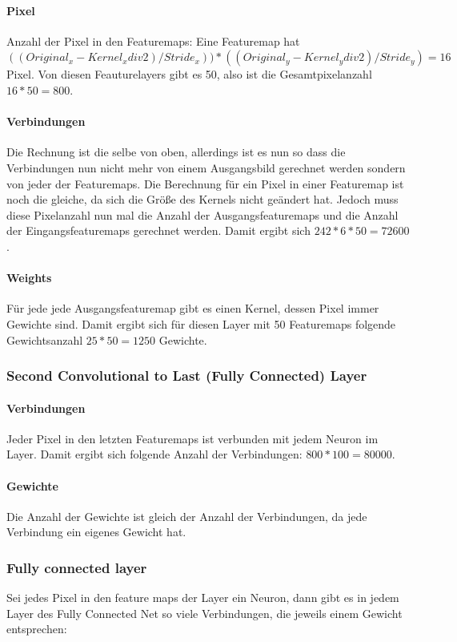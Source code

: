 \documentclass{article}
\begin{document}
\paragraph{Pixel}
Anzahl der Pixel in den Featuremaps: Eine Featuremap hat $((Original_x - Kernel_x div 2) / Stride_x)) * ((Original_y - Kernel_y div 2) / Stride_y) = 16$ Pixel.
Von diesen Feauturelayers gibt es 50, also ist die Gesamtpixelanzahl $16 * 50 = 800$.
\paragraph{Verbindungen}
Die Rechnung ist die selbe von oben, allerdings ist es nun so dass die Verbindungen nun nicht mehr von einem Ausgangsbild gerechnet werden sondern von jeder der Featuremaps. Die Berechnung für ein Pixel in einer Featuremap ist noch die gleiche, da sich die Größe des Kernels nicht geändert hat. Jedoch muss diese Pixelanzahl nun mal die Anzahl der Ausgangsfeaturemaps und die Anzahl der Eingangsfeaturemaps gerechnet werden. Damit ergibt sich $242 * 6 * 50 = 72600$.
\paragraph{Weights}
Für jede jede Ausgangsfeaturemap gibt es einen Kernel, dessen Pixel immer Gewichte sind. Damit ergibt sich für diesen Layer mit 50 Featuremaps folgende Gewichtsanzahl $25 * 50 = 1250$ Gewichte.

\subsubsection{Second Convolutional to Last (Fully Connected) Layer}
\paragraph{Verbindungen}
Jeder Pixel in den letzten Featuremaps ist verbunden mit jedem Neuron im Layer. Damit ergibt sich folgende Anzahl der Verbindungen: $800 * 100 = 80000$.
\paragraph{Gewichte}
Die Anzahl der Gewichte ist gleich der Anzahl der Verbindungen, da jede Verbindung ein eigenes Gewicht hat.

\subsubsection{Fully connected layer}
Sei jedes Pixel in den feature maps der Layer ein Neuron, dann gibt es in jedem Layer des Fully Connected Net so viele Verbindungen, die jeweils einem Gewicht entsprechen:
\end{document}
